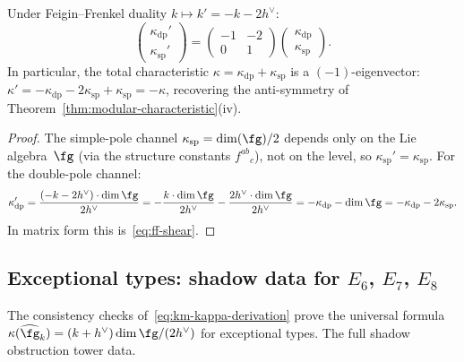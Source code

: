 \begin{proposition}
\label{prop:ff-channel-shear}
Under Feigin--Frenkel duality $k \mapsto k' = -k - 2h^\vee$:
\begin{equation}\label{eq:ff-shear}
\begin{pmatrix} \kappa_{\mathrm{dp}}' \\
\kappa_{\mathrm{sp}}' \end{pmatrix}
=
\begin{pmatrix} -1 & -2 \\ 0 & 1 \end{pmatrix}
\begin{pmatrix} \kappa_{\mathrm{dp}} \\
\kappa_{\mathrm{sp}} \end{pmatrix}.
\end{equation}
In particular, the total characteristic
$\kappa = \kappa_{\mathrm{dp}} + \kappa_{\mathrm{sp}}$
is a $(-1)$-eigenvector:
$\kappa' = -\kappa_{\mathrm{dp}} - 2\kappa_{\mathrm{sp}}
+ \kappa_{\mathrm{sp}} = -\kappa$,
recovering the anti-symmetry of
Theorem~\textup{\ref{thm:modular-characteristic}}(iv).
\end{proposition}

\begin{proof}
The simple-pole channel $\kappa_{\mathrm{sp}} =
\dim(\fg)/2$ depends only on the Lie algebra~$\fg$ (via the
structure constants $f^{ab}{}_c$), not on the level, so
$\kappa_{\mathrm{sp}}' = \kappa_{\mathrm{sp}}$.
For the double-pole channel:
\[
\kappa_{\mathrm{dp}}'
= \frac{(-k - 2h^\vee) \cdot \dim\fg}{2h^\vee}
= -\frac{k \cdot \dim\fg}{2h^\vee}
 - \frac{2h^\vee \cdot \dim\fg}{2h^\vee}
= -\kappa_{\mathrm{dp}} - \dim\fg
= -\kappa_{\mathrm{dp}} - 2\kappa_{\mathrm{sp}}.
\]
In matrix form this is~\eqref{eq:ff-shear}.
\end{proof}

\subsection{Exceptional types: shadow data for $E_6$, $E_7$, $E_8$}%
\label{sec:exceptional-shadow-data}

The consistency checks of~\eqref{eq:km-kappa-derivation} prove
the universal formula $\kappa(\widehat{\fg}_k) = (k + h^\vee)\dim\fg/(2h^\vee)$
for exceptional types. The full shadow obstruction tower data.

